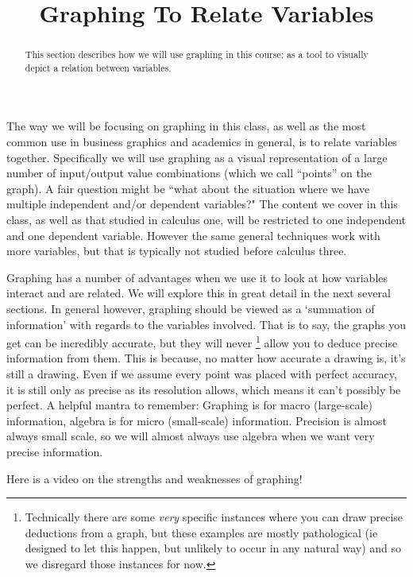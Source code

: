 \documentclass{ximera}
\title{Graphing To Relate Variables}
\begin{document}
\begin{abstract}
    This section describes how we will use graphing in this course; as a tool to visually depict a relation between variables.
\end{abstract}
\maketitle


The way we will be focusing on graphing in this class, as well as the most common use in business graphics and academics in general, is to relate variables together. Specifically we will use graphing as a visual representation of a large number of input/output value combinations (which we call ``points'' on the graph). A fair question might be ``what about the situation where we have multiple independent and/or dependent variables?" The content we cover in this class, as well as that studied in calculus one, will be restricted to one independent and one dependent variable. However the same general techniques work with more variables, but that is typically not studied before calculus three.

Graphing has a number of advantages when we use it to look at how variables interact and are related. We will explore this in great detail in the next several sections. In general however, graphing should be viewed as a `summation of information' with regards to the variables involved. That is to say, the graphs you get can be incredibly accurate, but they will never%
\footnote{Technically there are some \textit{very} specific instances where you can draw precise deductions from a graph, but these examples are mostly pathological (ie designed to let this happen, but unlikely to occur in any natural way) and so we disregard those instances for now.}
allow you to deduce precise information from them. This is because, no matter how accurate a drawing is, it's still a drawing. Even if we assume every point was placed with perfect accuracy, it is still only as precise as its resolution allows, which means it can't possibly be perfect. A helpful mantra to remember: Graphing is for macro (large-scale) information, algebra is for micro (small-scale) information. Precision is almost always small scale, so we will almost always use algebra when we want very precise information.


Here is a video on the strengths and weaknesses of graphing!

\end{document}
